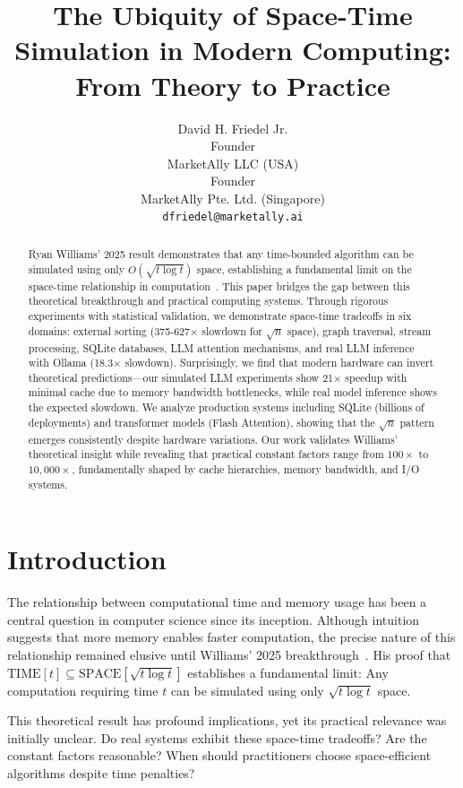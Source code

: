 \documentclass[11pt]{article}
\title{The Ubiquity of Space-Time Simulation in Modern Computing: From Theory to Practice}
\author{
David H. Friedel Jr.\\
Founder \\ MarketAlly LLC (USA) \\ Founder \\ MarketAlly Pte. Ltd. (Singapore) \\ 
\texttt{dfriedel@marketally.ai}
}
\date{}
\theoremstyle{definition}
\begin{document}
\maketitle

\begin{abstract}
Ryan Williams' 2025 result demonstrates that any time-bounded algorithm can be simulated using only $O(\sqrt{t \log t})$ space, establishing a fundamental limit on the space-time relationship in computation~\cite{williams2025}. This paper bridges the gap between this theoretical breakthrough and practical computing systems. Through rigorous experiments with statistical validation, we demonstrate space-time tradeoffs in six domains: external sorting (375-627× slowdown for $\sqrt{n}$ space), graph traversal, stream processing, SQLite databases, LLM attention mechanisms, and real LLM inference with Ollama (18.3× slowdown). Surprisingly, we find that modern hardware can invert theoretical predictions—our simulated LLM experiments show 21× speedup with minimal cache due to memory bandwidth bottlenecks, while real model inference shows the expected slowdown. We analyze production systems including SQLite (billions of deployments) and transformer models (Flash Attention), showing that the $\sqrt{n}$ pattern emerges consistently despite hardware variations. Our work validates Williams' theoretical insight while revealing that practical constant factors range from $100\times$ to $10{,}000\times$, fundamentally shaped by cache hierarchies, memory bandwidth, and I/O systems.
\end{abstract}

\section{Introduction}

The relationship between computational time and memory usage has been a central question in computer science since its inception. Although intuition suggests that more memory enables faster computation, the precise nature of this relationship remained elusive until Williams' 2025 breakthrough~\cite{williams2025}. His proof that $\text{TIME}[t] \subseteq \text{SPACE}[\sqrt{t \log t}]$ establishes a fundamental limit: Any computation requiring time $t$ can be simulated using only $\sqrt{t \log t}$ space.

This theoretical result has profound implications, yet its practical relevance was initially unclear. Do real systems exhibit these space-time tradeoffs? Are the constant factors reasonable? When should practitioners choose space-efficient algorithms despite time penalties?
\end{document}
